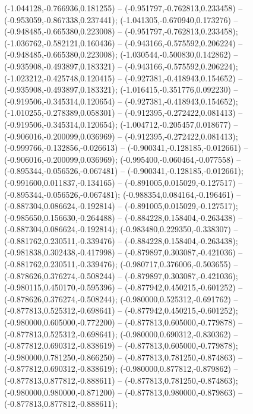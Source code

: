  (-1.044128,-0.766936,0.181255) -- (-0.951797,-0.762813,0.233458) -- (-0.953059,-0.867338,0.237441);
 (-1.041305,-0.670940,0.173276) -- (-0.948485,-0.665380,0.223008) -- (-0.951797,-0.762813,0.233458);
 (-1.036762,-0.582121,0.160436) -- (-0.943166,-0.575592,0.206224) -- (-0.948485,-0.665380,0.223008);
 (-1.030544,-0.500830,0.142862) -- (-0.935908,-0.493897,0.183321) -- (-0.943166,-0.575592,0.206224);
 (-1.023212,-0.425748,0.120415) -- (-0.927381,-0.418943,0.154652) -- (-0.935908,-0.493897,0.183321);
 (-1.016415,-0.351776,0.092230) -- (-0.919506,-0.345314,0.120654) -- (-0.927381,-0.418943,0.154652);
 (-1.010255,-0.278389,0.058301) -- (-0.912395,-0.272422,0.081413) -- (-0.919506,-0.345314,0.120654);
 (-1.004712,-0.205457,0.018677) -- (-0.906016,-0.200099,0.036969) -- (-0.912395,-0.272422,0.081413);
 (-0.999766,-0.132856,-0.026613) -- (-0.900341,-0.128185,-0.012661) -- (-0.906016,-0.200099,0.036969);
 (-0.995400,-0.060464,-0.077558) -- (-0.895344,-0.056526,-0.067481) -- (-0.900341,-0.128185,-0.012661);
 (-0.991600,0.011837,-0.134165) -- (-0.891005,0.015029,-0.127517) -- (-0.895344,-0.056526,-0.067481);
 (-0.988354,0.084164,-0.196461) -- (-0.887304,0.086624,-0.192814) -- (-0.891005,0.015029,-0.127517);
 (-0.985650,0.156630,-0.264488) -- (-0.884228,0.158404,-0.263438) -- (-0.887304,0.086624,-0.192814);
 (-0.983480,0.229350,-0.338307) -- (-0.881762,0.230511,-0.339476) -- (-0.884228,0.158404,-0.263438);
 (-0.981838,0.302438,-0.417998) -- (-0.879897,0.303087,-0.421036) -- (-0.881762,0.230511,-0.339476);
 (-0.980717,0.376006,-0.503655) -- (-0.878626,0.376274,-0.508244) -- (-0.879897,0.303087,-0.421036);
 (-0.980115,0.450170,-0.595396) -- (-0.877942,0.450215,-0.601252) -- (-0.878626,0.376274,-0.508244);
 (-0.980000,0.525312,-0.691762) -- (-0.877813,0.525312,-0.698641) -- (-0.877942,0.450215,-0.601252);
 (-0.980000,0.605000,-0.772200) -- (-0.877813,0.605000,-0.779878) -- (-0.877813,0.525312,-0.698641);
 (-0.980000,0.690312,-0.830362) -- (-0.877812,0.690312,-0.838619) -- (-0.877813,0.605000,-0.779878);
 (-0.980000,0.781250,-0.866250) -- (-0.877813,0.781250,-0.874863) -- (-0.877812,0.690312,-0.838619);
 (-0.980000,0.877812,-0.879862) -- (-0.877813,0.877812,-0.888611) -- (-0.877813,0.781250,-0.874863);
 (-0.980000,0.980000,-0.871200) -- (-0.877813,0.980000,-0.879863) -- (-0.877813,0.877812,-0.888611);
